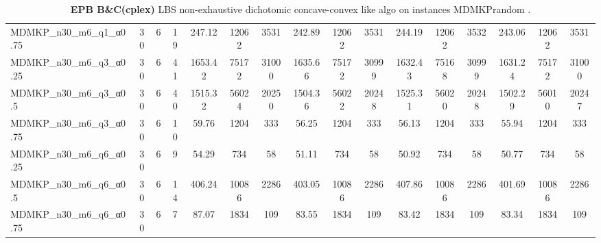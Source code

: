 \begin{sidewaystable}[!ht]
{\begin{tabular}{lccccccccccccccc}
MDMKP\_n30\_m6\_q1\_α0.75 & 30 & 6 & 19 & 247.12 & 12062 & 3531 & 242.89 & 12062 & 3531 & 244.19 & 12062 & 3532 & 243.06 & 12062 & 3531 \\
MDMKP\_n30\_m6\_q3\_α0.25 & 30 & 6 & 41 & 1653.42 & 75172 & 31000 & 1635.66 & 75172 & 30999 & 1632.43 & 75168 & 30999 & 1631.24 & 75172 & 31000 \\
MDMKP\_n30\_m6\_q3\_α0.5 & 30 & 6 & 40 & 1515.32 & 56024 & 20250 & 1504.36 & 56022 & 20248 & 1525.31 & 56020 & 20248 &  \textcolor{blue2}{1502.29} & 56010 & 20247 \\
MDMKP\_n30\_m6\_q3\_α0.75 & 30 & 6 & 10 & 59.76 & 1204 & 333 & 56.25 & 1204 & 333 & 56.13 & 1204 & 333 & 55.94 & 1204 & 333 \\
MDMKP\_n30\_m6\_q6\_α0.25 & 30 & 6 & 9 & 54.29 & 734 & 58 & 51.11 & 734 & 58 & 50.92 & 734 & 58 &  \textcolor{blue2}{50.77} & 734 & 58 \\
MDMKP\_n30\_m6\_q6\_α0.5 & 30 & 6 & 14 & 406.24 & 10086 & 2286 & 403.05 & 10086 & 2286 & 407.86 & 10086 & 2286 &  \textcolor{blue2}{401.69} & 10086 & 2286 \\
MDMKP\_n30\_m6\_q6\_α0.75 & 30 & 6 & 7 & 87.07 & 1834 & 109 & 83.55 & 1834 & 109 & 83.42 & 1834 & 109 & 83.34 & 1834 & 109 \\
\bottomrule
\end{tabular}
}%
\caption{\textbf{EPB B\&C(cplex) }LBS non-exhaustive dichotomic concave-convex like algo on instances MDMKPrandom .}
\label{tab:table_lambda_EPB_MDMKPrandom }
\end{sidewaystable}
